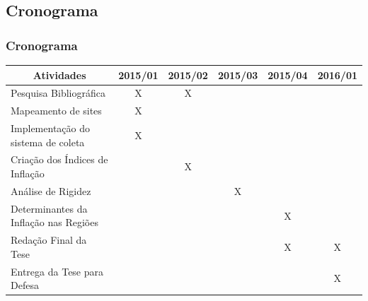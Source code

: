 \documentclass[aspectratio=169]{beamer}
\begin{document}
\subsection{Cronograma}

\begin{frame}\frametitle{Cronograma}
\begin{table}[h]
\begin{tabular}{llllll}
\hline
\multicolumn{1}{c}{\textbf{Atividades}} & 2015/01               & 2015/02               & 2015/03               & 2015/04               & 2016/01               \\ \hline
Pesquisa Bibliográfica                  & \multicolumn{1}{c}{X} & \multicolumn{1}{c}{X} &                       &                       &                       \\
Mapeamento de sites                     & \multicolumn{1}{c}{X} &                       &                       &                       &                       \\
Implementação do sistema de coleta      & \multicolumn{1}{c}{X} &                       &                       &                       &                       \\
Criação dos Índices de Inflação         &                       & \multicolumn{1}{c}{X} &                       &                       &                       \\
Análise de Rigidez                      &                       &                       & \multicolumn{1}{c}{X} &                       &                       \\
Determinantes da Inflação nas Regiões   &                       &                       &                       & \multicolumn{1}{c}{X} &                       \\
Redação Final da Tese                   &                       &                       &                       & \multicolumn{1}{c}{X} & \multicolumn{1}{c}{X} \\
Entrega da Tese para Defesa             &                       &                       &                       &                       & \multicolumn{1}{c}{X} \\ \hline
\end{tabular}
\end{table}
\end{frame}
\end{document}
